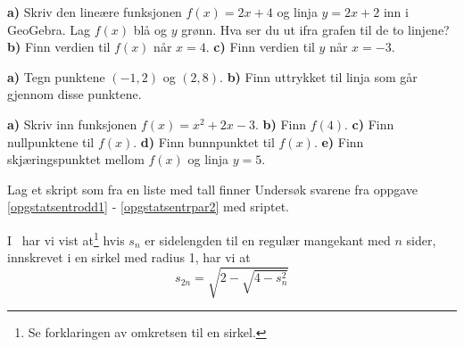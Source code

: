 





\nes

\textbf{a)} Skriv den lineære funksjonen $ {f(x)=2x+4} $ og linja $ {y=2x+2} $ inn i GeoGebra. Lag $ f(x) $ blå og $ y $ grønn. Hva ser du ut ifra grafen til de to linjene?\bs
\textbf{b)} Finn verdien til $ f(x) $ når $ {x=4} $.\bs
\textbf{c)} Finn verdien til $ y $ når $ {x=-3} $.\vsk

\textbf{a)} Tegn punktene $ (-1,2) $ og $ (2,8) $.\bs
\textbf{b)} Finn uttrykket til linja som går gjennom disse punktene.\vsk

\textbf{a)} Skriv inn funksjonen $ {f(x)=x^2+2x-3} $.\bs
\textbf{b)} Finn $ f(4) $.\bs
\textbf{c)} Finn nullpunktene til $ f(x) $.\bs
\textbf{d)} Finn bunnpunktet til $ f(x) $.\bs
\textbf{e)} Finn skjæringspunktet mellom $ f(x) $ og linja $ y=5 $.



\newpage
{}
Lag et skript som fra en liste med tall finner
Undersøk svarene fra {\color{blue}oppgave \ref{opgstatsentrodd1} - \ref{opgstatsentrpar2}} med sriptet.

I \mb\ har vi vist at\footnote{Se forklaringen av omkretsen til en sirkel.} hvis $ s_n $ er sidelengden til en regulær mangekant med $ n $ sider, innskrevet i en sirkel med radius 1, har vi at
\[ s_{2n}=\sqrt{2-\sqrt{4-s_n^2}} \]




